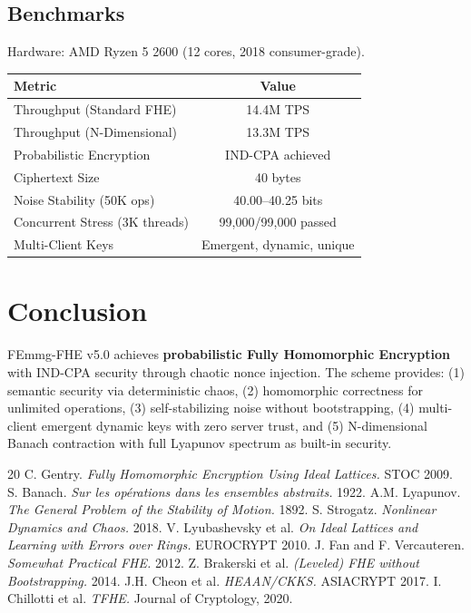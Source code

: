 \documentclass{article}
\begin{document}
\subsection{Benchmarks}

Hardware: AMD Ryzen 5 2600 (12 cores, 2018 consumer-grade).

\begin{table}[h]
\centering
\begin{tabular}{|l|c|}
\hline
\textbf{Metric} & \textbf{Value} \\
\hline
Throughput (Standard FHE) & 14.4M TPS \\
Throughput (N-Dimensional) & 13.3M TPS \\
Probabilistic Encryption & IND-CPA achieved \\
Ciphertext Size & 40 bytes \\
Noise Stability (50K ops) & 40.00--40.25 bits \\
Concurrent Stress (3K threads) & 99,000/99,000 passed \\
Multi-Client Keys & Emergent, dynamic, unique \\
\hline
\end{tabular}
\end{table}

\section{Conclusion}

FEmmg-FHE v5.0 achieves \textbf{probabilistic Fully Homomorphic Encryption} with IND-CPA security through chaotic nonce injection. The scheme provides: (1) semantic security via deterministic chaos, (2) homomorphic correctness for unlimited operations, (3) self-stabilizing noise without bootstrapping, (4) multi-client emergent dynamic keys with zero server trust, and (5) N-dimensional Banach contraction with full Lyapunov spectrum as built-in security.

\begin{thebibliography}{20}
 C. Gentry. \textit{Fully Homomorphic Encryption Using Ideal Lattices.} STOC 2009.
 S. Banach. \textit{Sur les op\'erations dans les ensembles abstraits.} 1922.
 A.M. Lyapunov. \textit{The General Problem of the Stability of Motion.} 1892.
 S. Strogatz. \textit{Nonlinear Dynamics and Chaos.} 2018.
 V. Lyubashevsky et al. \textit{On Ideal Lattices and Learning with Errors over Rings.} EUROCRYPT 2010.
 J. Fan and F. Vercauteren. \textit{Somewhat Practical FHE.} 2012.
 Z. Brakerski et al. \textit{(Leveled) FHE without Bootstrapping.} 2014.
 J.H. Cheon et al. \textit{HEAAN/CKKS.} ASIACRYPT 2017.
 I. Chillotti et al. \textit{TFHE.} Journal of Cryptology, 2020.
\end{thebibliography}
\end{document}
